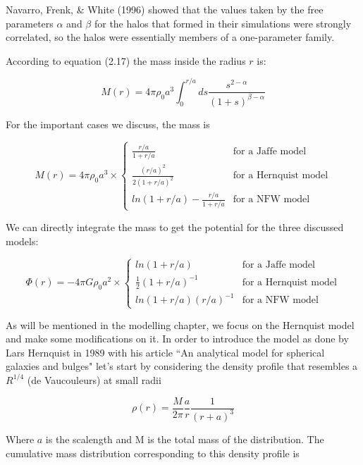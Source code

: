 Navarro, Frenk, \& White (1996) showed that the values taken by the free parameters $\alpha$ and $\beta$ for the halos that formed in their simulations were strongly correlated, so the halos were essentially members of a one-parameter family. 

According to equation (2.17) the mass inside the radius $r$ is:

\begin{equation}
M(r)=4\pi \rho_{0}a^{3}\int_{0}^{r/a}ds\frac{s^{2-\alpha}}{(1+s)^{\beta-\alpha}}
\end{equation}

For the important cases we discuss, the mass is

\begin{equation}
M(r) = 4\pi \rho_{0}a^{3} \times \left\lbrace
\begin{array}{lll}
\frac{r/a}{1+r/a} & \text{for a Jaffe model}\\
\frac{(r/a)^{2}}{2(1+r/a)^{2}} & \text{for a Hernquist model}\\
ln(1+r/a)-\frac{r/a}{1+r/a} & \text{for a NFW model}
\end{array}
\right.
\end{equation} 

We can directly integrate the mass to get the potential for the three discussed models:

\begin{equation}
\Phi(r) = -4\pi G\rho_{0}a^{2} \times \left\lbrace
\begin{array}{lll}
ln(1+r/a) & \text{for a Jaffe model}\\
\frac{1}{2}(1+r/a)^{-1} & \text{for a Hernquist model}\\
ln(1+r/a)(r/a)^{-1} & \text{for a NFW model}
\end{array}
\right.
\end{equation} 

As will be mentioned in the modelling chapter, we focus on the Hernquist model and make some modifications on it. In order to introduce the model as done by Lars Hernquist in 1989 with his article ``An analytical model for spherical galaxies and bulges" let's start by considering the density profile that resembles a $R^{1/4}$ (de Vaucouleurs) at small radii

\begin{equation}
\rho(r)=\frac{M}{2\pi}\frac{a}{r}\frac{1}{\left(r+a\right)^{3}}
\end{equation}

Where $a$ is the scalength and M is the total mass of the distribution. The cumulative mass distribution corresponding to this density profile is

